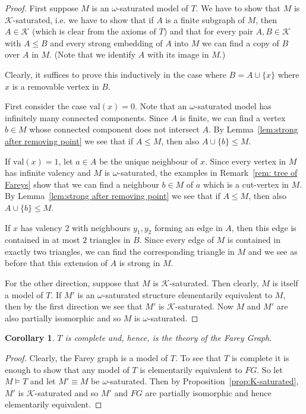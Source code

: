 \documentclass{amsart}
\newcommand{\K}{\mathcal{K}}
\newcommand{\val}{\mathrm{val}}
\newtheorem{corollary}[defi]{Corollary}
\begin{document}
\begin{proof}
First suppose $M$ is an $\omega$-saturated model of $T$. We have to show that  $M$ is $\K$-saturated, i.e. we have to show that if $A$ is a finite subgraph of $M$, then $A\in \K$ (which is clear from the axioms of $T$) and that for every pair $A, B\in \K$ with $A\leq B$ and  every strong embedding of $A$ into $M$ we can find a copy of $B$ over $A$ in $M$. (Note that we identify $A$ with its image in $M$.)

Clearly, it suffices to prove this inductively in the case where $B=A\cup\{x\}$ where $x$ is a removable vertex in $B$. 

First consider the case $\val(x)=0$. Note that an $\omega$-saturated model has infinitely many connected components. Since $A$ is finite, we can find a vertex $b\in M$ whose connected component does not intersect $A$. By Lemma~\ref{lem:strong after removing point} we see that if $A\leq M$, then also $A\cup\{ b\}\leq M$.

If $\val(x)=1$, let $a\in A$ be the unique neighbour of $x$. Since every vertex in $M$ has infinite valency and $M$ is $\omega$-saturated, the examples in Remark~\ref{rem: tree of Fareys} show that  we can find a neighbour $b\in M$ of $a$ which is a cut-vertex in $M$.  By Lemma~\ref{lem:strong after removing point} we see that if $A\leq M$, then also $A\cup\{ b\}\leq M$.

    If $x$ has valency $2$ with neighbours $y_1,y_2$ forming an edge in $A$, then this edge is contained in at most $2$ triangles in $B$. Since every edge of $M$ is contained in exactly two triangles, we can find the corresponding triangle in $M$ and we see as before that this extension of $A$ is strong in $M$.

    For the other direction, suppose that $M$ is $\K$-saturated. Then clearly, $M$ is itself a  model of $T$. If $M'$ is an $\omega$-saturated structure elementarily equivalent to $M$, then by the first direction we see that $M'$ is $\K$-saturated. Now $M$ and $M'$ are also partially isomorphic and so $M$ is $\omega$-saturated.
\end{proof}

\begin{corollary}\label{cor:th(FG)}
   $T$ is complete and, hence, is the theory of the Farey Graph.  
\end{corollary}
\begin{proof}
 Clearly, the Farey graph is a model of $T$. To see that $T$ is complete it  is enough to show that  any model of $T$ is elementarily equivalent to $FG$. So let $M\models T$ and let $M'\equiv M$ be $\omega$-saturated. Then by  Proposition~\ref{prop:K-saturated}, $M'$ is $\K$-saturated and so $M'$ and $FG$ are partially isomorphic and hence elementarily equivalent. 
\end{proof}
\end{document}
